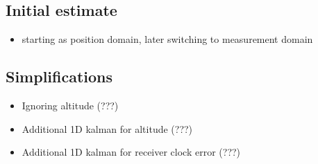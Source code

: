 \subsection{Initial estimate}
\begin{itemize}
\item starting as position domain, later switching to measurement domain
\end{itemize}

\subsection{Simplifications}
\begin{itemize}
\item Ignoring altitude (???)
\item Additional 1D kalman for altitude (???)
\item Additional 1D kalman for receiver clock error (???)
\end{itemize}
